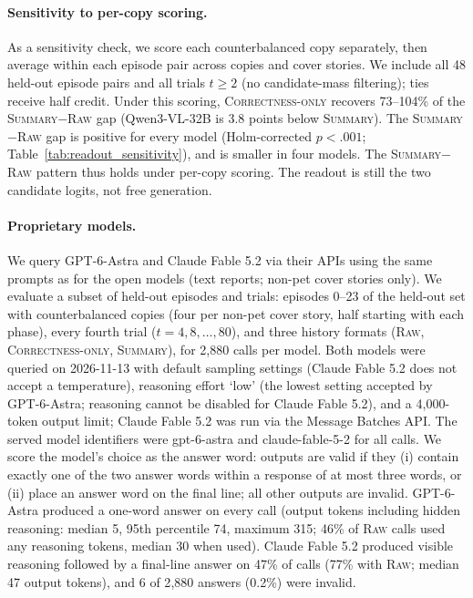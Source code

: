 \documentclass[letterpaper]{article} %
\newcommand{\Raw}{\textsc{Raw}}
\newcommand{\CorrectnessOnly}{\textsc{Correctness-only}}
\newcommand{\Summary}{\textsc{Summary}}
\begin{document}
\paragraph{Sensitivity to per-copy scoring.} As a sensitivity check, we score each counterbalanced copy separately, then average within each episode pair across copies and cover stories. We include all 48 held-out episode pairs and all trials $t\ge2$ (no candidate-mass filtering); ties receive half credit. Under this scoring, \CorrectnessOnly{} recovers 73--104\% of the \Summary{}$-$\Raw{} gap (Qwen3-VL-32B is 3.8 points below \Summary{}). The \Summary{}$-$\Raw{} gap is positive for every model (Holm-corrected $p<.001$; Table~\ref{tab:readout_sensitivity}), and is smaller in four models. The \Summary{}$-$\Raw{} pattern thus holds under per-copy scoring. The readout is still the two candidate logits, not free generation.

\paragraph{Proprietary models.} We query GPT-6-Astra and Claude Fable 5.2 via their APIs using the same prompts as for the open models (text reports; non-pet cover stories only). We evaluate a subset of held-out episodes and trials: episodes 0--23 of the held-out set with counterbalanced copies (four per non-pet cover story, half starting with each phase), every fourth trial ($t=4,8,\dots,80$), and three history formats (\Raw{}, \CorrectnessOnly{}, \Summary{}), for 2{,}880 calls per model. Both models were queried on 2026-11-13 with default sampling settings (Claude Fable 5.2 does not accept a temperature), reasoning effort `low' (the lowest setting accepted by GPT-6-Astra; reasoning cannot be disabled for Claude Fable 5.2), and a 4{,}000-token output limit; Claude Fable 5.2 was run via the Message Batches API. The served model identifiers were gpt-6-astra and claude-fable-5-2 for all calls. We score the model's choice as the answer word: outputs are valid if they (i) contain exactly one of the two answer words within a response of at most three words, or (ii) place an answer word on the final line; all other outputs are invalid. GPT-6-Astra produced a one-word answer on every call (output tokens including hidden reasoning: median 5, 95th percentile 74, maximum 315; 46\% of \Raw{} calls used any reasoning tokens, median 30 when used). Claude Fable 5.2 produced visible reasoning followed by a final-line answer on 47\% of calls (77\% with \Raw{}; median 47 output tokens), and 6 of 2{,}880 answers (0.2\%) were invalid.
\end{document}
